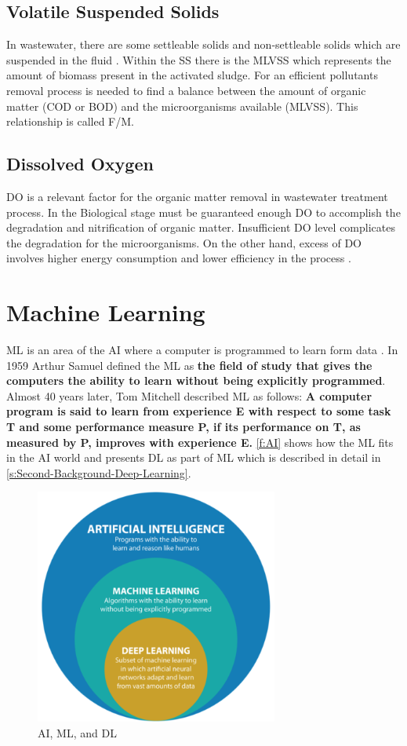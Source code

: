 \subsection{Volatile Suspended Solids}
In wastewater, there are some settleable solids and non-settleable solids which are suspended in the fluid \cite{Wiesmann2007}. Within the \ac{SS} there is the \ac{MLVSS} which represents the amount of biomass present in the activated sludge. For an efficient pollutants removal process is needed to find a balance between the amount of organic matter (\ac{COD} or \ac{BOD}) and the microorganisms available (\ac{MLVSS}). This relationship is called F/M.

\subsection{Dissolved Oxygen}
\ac{DO} is a relevant factor for the organic matter removal in wastewater treatment process. In the Biological stage must be guaranteed enough \ac{DO} to accomplish the degradation and nitrification of organic matter. Insufficient \ac{DO} level complicates the degradation for the microorganisms. On the other hand, excess of \ac{DO} involves higher energy consumption and lower efficiency in the process \cite{Zhao2021}. 

\section{Machine Learning}
\label{s:Second-Background-Topic}

\ac{ML} is an area of the \ac{AI} where a computer is programmed to learn form data \cite{Ray2019}. In 1959 Arthur Samuel defined the \ac{ML} as \textbf{the field of study that gives the computers the ability to learn without being explicitly programmed}. Almost 40 years later, Tom Mitchell described \ac{ML} as follows: \textbf{A computer program is said to learn from experience E with respect to some task T and some performance measure P, if its performance on T, as measured by P, improves with experience E.} \autoref{f:AI} shows how the \ac{ML} fits in the \ac{AI} world and presents \ac{DL} as part of \ac{ML} which is described in detail in \autoref{s:Second-Background-Deep-Learning}.

\begin{figure}[h]
\centering
\includegraphics[width=8cm]{figures/Ch2/AI-ML-DL.png}
\caption{AI, ML, and DL \cite{raza_cinquergrana_2018}}
\label{f:AI}
\end{figure}

